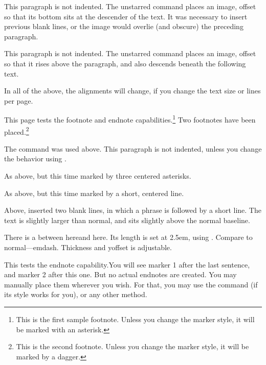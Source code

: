 \documentclass[test]{novel} %
\begin{document}
\null\null\null

\noindent{}This paragraph is not indented. The unstarred command places an image, offset so that its bottom sits at the descender of the text. It was necessary to insert previous blank lines, or the image would overlie (and obscure) the preceding paragraph.

\null\null

\noindent{}This paragraph is not indented. The unstarred command places an image, offset so that it rises above the paragraph, and also descends beneath the following text. 

\null\null

In all of the above, the alignments will change, if you change the text size or lines per page.

\clearpage



This page tests the footnote and endnote capabilities.\footnote{This is the first sample footnote. Unless you change the marker style, it will be marked with an asterisk.} Two footnotes have been placed.\footnote{This is the second footnote. Unless you change the marker style, it will be marked by a dagger.}

\scenebreak

The \string\scenebreak\space command was used above. This paragraph is not indented, unless you change the behavior using \string\SetScenebreakIndent.

\scenestars

As above, but this time marked by three centered asterisks.

\sceneline

As above, but this time marked by a short, centered line.


Above, \string\QuickChapter\space inserted two blank lines, in which a phrase is followed by a short line. The text is slightly larger than normal, and sits slightly above the normal baseline.

\null

There is a \string\bigemdash\space between here\makebox[2.5em]{\bigemdash}and here. Its length is set at 2.5em, using \string\makebox. Compare to normal—emdash. Thickness and yoffset is adjustable.

\null

This tests the endnote capability.\endnote You will see marker 1 after the last sentence, and marker 2 after this one.\endnote{} But no actual endnotes are created. You may manually place them wherever you wish. For that, you may use the \string\endnotetext\space command (if its style works for you), or any other method.
\end{document}
